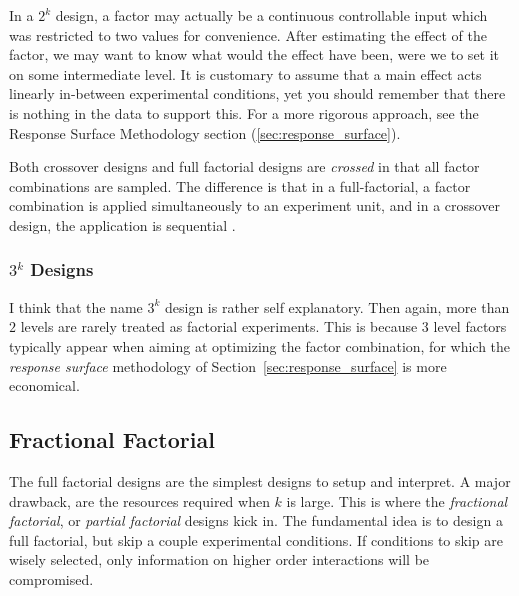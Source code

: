\begin{remark}
In a $2^k$ design, a factor may actually be a continuous controllable input which was restricted to two values for convenience. 
After estimating the effect of the factor, we may want to know what would the effect have been, were we to set it on some intermediate level.
It is customary to assume that a main effect acts linearly in-between experimental conditions, yet you should remember that there is nothing in the data to support this.
For a more rigorous approach, see the Response Surface Methodology section (\ref{sec:response_surface}).
\end{remark}


\begin{remark}
Both crossover designs and full factorial designs are \emph{crossed} in that all factor combinations are sampled. 
The difference is that in a full-factorial, a factor combination is applied simultaneously to an experiment unit, and in a crossover design, the application is sequential \citep{everitt_cambridge_2010}.
\end{remark}



\subsubsection{$3^k$ Designs}
I think that the name $3^k$ design is rather self explanatory.
Then again, more than $2$ levels are rarely treated as factorial experiments. 
This is because $3$ level factors typically appear when aiming at optimizing the factor combination, for which the \emph{response surface} methodology of Section~\ref{sec:response_surface} is more economical.




\subsection{Fractional Factorial}
The full factorial designs are the simplest designs to setup and interpret. 
A major drawback, are the resources required when $k$ is large. 
This is where the \emph{fractional factorial}, or \emph{partial factorial} designs kick in.
The fundamental idea is to design a full factorial, but skip a couple experimental conditions. If conditions to skip are wisely selected, only information on higher order interactions will be compromised.


